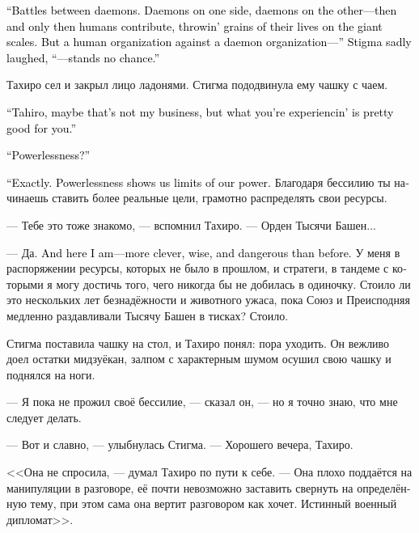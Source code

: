 \documentclass[a4paper,12pt,fleqn]{book}\usepackage{cooltooltips}\usepackage{polyglossia}\setdefaultlanguage[babelshorthands=true]{russian}\setotherlanguage{english}\defaultfontfeatures{Ligatures=TeX,Mapping=tex-text} \usepackage{xcolor}\definecolor{lightgray}{HTML}{bbbbbb}\color{lightgray}\newcommand{\ml}[3]{\textenglish{\textcolor{black}{#3}}}
\begin{document}
{\ml{$0$}
{--- Исход сражений между демонами.}
{``Battles between daemons.}
\ml{$0$}
{С одной стороны демоны и с другой стороны демоны --- тогда люди что-то решают, кидая песчинки своих жизней на гигантские весы.}
{Daemons on one side, daemons on the other---then and only then humans contribute, throwin' grains of their lives on the giant scales.}
\ml{$0$}
{Но организация людей против организации демонов... --- Стигма грустно усмехнулась, --- без шансов.}
{But a human organization against a daemon organization---'' Stigma sadly laughed, ``---stands no chance.''}

Тахиро сел и закрыл лицо ладонями.
Стигма пододвинула ему чашку с чаем.

\ml{$0$}
{--- Тахиро, возможно, я лезу не в своё дело, но то, что ты сейчас испытываешь, полезно для тебя.}
{``Tahiro, maybe that's not my business, but what you're experiencin' is pretty good for you.''}

\ml{$0$}
{--- Бессилие?}
{``Powerlessness?''}

\ml{$0$}
{--- Именно.}
{``Exactly.}
\ml{$0$}
{Бессилие показывает нам границы наших сил.}
{Powerlessness shows us limits of our power.}
Благодаря бессилию ты начинаешь ставить более реальные цели, грамотно распределять свои ресурсы.

--- Тебе это тоже знакомо, --- вспомнил Тахиро.
--- Орден Тысячи Башен...

--- Да.
\ml{$0$}
{И вот я здесь --- гораздо умнее, мудрее и опаснее, чем была раньше.}
{And here I am---more clever, wise, and dangerous than before.}
У меня в распоряжении ресурсы, которых не было в прошлом, и стратеги, в тандеме с которыми я могу достичь того, чего никогда бы не добилась в одиночку.
Стоило ли это нескольких лет безнадёжности и животного ужаса, пока Союз и Преисподняя медленно раздавливали Тысячу Башен в тисках?
Стоило.

Стигма поставила чашку на стол, и Тахиро понял: пора уходить.
Он вежливо доел остатки мидзуёкан, залпом с характерным шумом осушил свою чашку и поднялся на ноги.

--- Я пока не прожил своё бессилие, --- сказал он, --- но я точно знаю, что мне следует делать.

--- Вот и славно, --- улыбнулась Стигма.
--- Хорошего вечера, Тахиро.

<<Она не спросила, --- думал Тахиро по пути к себе.
--- Она плохо поддаётся на манипуляции в разговоре, её почти невозможно заставить свернуть на определённую тему, при этом сама она вертит разговором как хочет.
Истинный военный дипломат>>.

}
\end{document}
